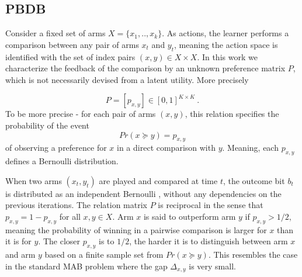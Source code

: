 \documentclass[MSc,beforeExam]{iitcsthesis}
\begin{document}
	\subsection{PBDB}
		Consider a fixed set of arms $X = \{x_1,..,x_k\}$.
		As actions, the learner performs a comparison between any pair of arms $x_t$ and $y_t$, meaning the action space is identified with the set of index pairs $(x,y)\in X\times X$. %
		In this work  we characterize the feedback of the comparison by an unknown preference matrix $P$, which is not necessarily devised from a latent utility.
		More precisely
		
		\begin{equation}\label{eq:preference_matrix}
			P = [p_{x,y}] \in [0,1]^{K \times K} \ .
		\end{equation}
		To be more precise - for each pair of arms $(x ,y)$, this relation specifies the probability of the event
		\begin{equation}\label{eq:p_xy}
			Pr(x \succeq y) = p_{x, y}
		\end{equation}
		of observing a preference for $x$ in a direct comparison with $y$.
		Meaning, each $p_{x,y}$ defines a Bernoulli distribution.
		
		When  two arms $(x_t ,y_t)$ are played and compared at time $t$, the outcome bit $b_t$ is distributed as an independent Bernoulli , without any dependencies on the previous iterations.
		The relation matrix $P$ is reciprocal in the sense that $p_{x,y} = 1-p_{x,y}$ for all $x,y \in X$.
		Arm $x$ is said to outperform arm $y$ if $p_{x,y} > 1/2$, meaning the probability of winning in a pairwise comparison is larger for $x$ than it is for $y$. 
		The closer $p_{x,y}$ is to $1/2$, the harder it is to distinguish between arm $x$ and arm $y$ based on a finite sample set from $Pr(x \succeq y)$. This resembles the case in the standard MAB problem where the gap $\Delta_{x,y}$ is very small.
\end{document}
